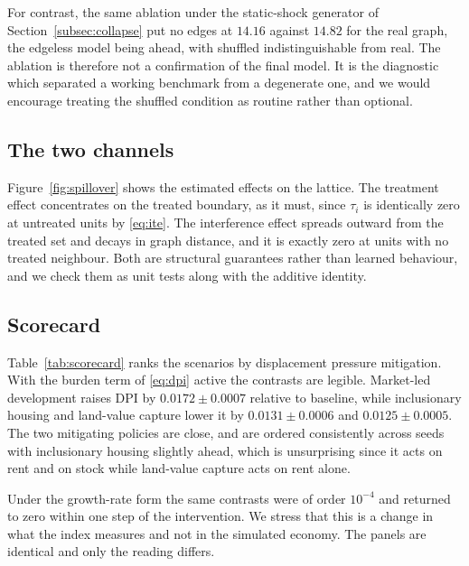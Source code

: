 \documentclass[journal]{IEEEtran}
\newcommand{\DPI}{\mathrm{DPI}}
\begin{document}
For contrast, the same ablation under the static-shock generator of
Section~\ref{subsec:collapse} put no edges at $14.16$ against $14.82$ for the
real graph, the edgeless model being ahead, with shuffled indistinguishable from
real. The ablation is therefore not a confirmation of the final model. It is the
diagnostic which separated a working benchmark from a degenerate one, and we
would encourage treating the shuffled condition as routine rather than optional.

\subsection{The two channels}

Figure~\ref{fig:spillover} shows the estimated effects on the lattice. The
treatment effect concentrates on the treated boundary, as it must, since
$\tau_i$ is identically zero at untreated units by \eqref{eq:ite}. The
interference effect spreads outward from the treated set and decays in graph
distance, and it is exactly zero at units with no treated neighbour. Both are
structural guarantees rather than learned behaviour, and we check them as unit
tests along with the additive identity.

\subsection{Scorecard}

Table~\ref{tab:scorecard} ranks the scenarios by displacement pressure
mitigation. With the burden term of \eqref{eq:dpi} active the contrasts are
legible. Market-led development raises $\DPI$ by $0.0172 \pm 0.0007$ relative to
baseline, while inclusionary housing and land-value capture lower it by
$0.0131 \pm 0.0006$ and $0.0125 \pm 0.0005$. The two mitigating policies are
close, and are ordered consistently across seeds with inclusionary housing
slightly ahead, which is unsurprising since it acts on rent and on stock while
land-value capture acts on rent alone.

Under the growth-rate form the same contrasts were of order $10^{-4}$ and
returned to zero within one step of the intervention. We stress that this is a
change in what the index measures and not in the simulated economy. The panels
are identical and only the reading differs.
\end{document}
